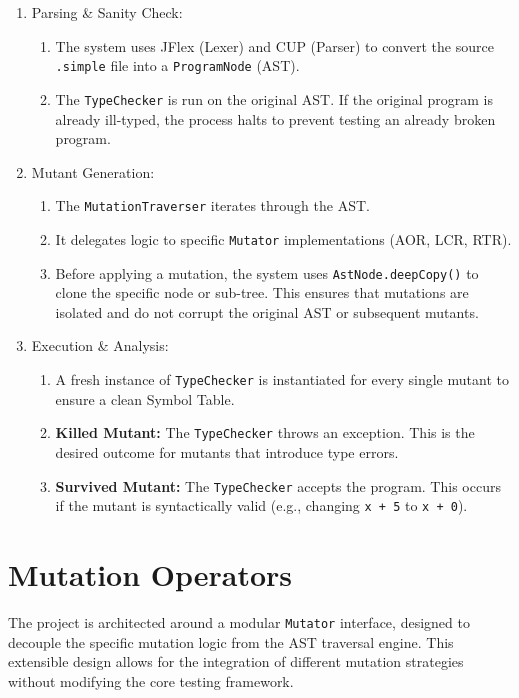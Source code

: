 \documentclass[titlepage]{article}
\begin{document}
\begin{enumerate}
    \item {
    Parsing \& Sanity Check:
        \begin{enumerate}
            \item The system uses JFlex (Lexer) and CUP (Parser) to convert the source \texttt{.simple} file into a \texttt{ProgramNode} (AST).
            \item The \texttt{TypeChecker} is run on the original AST. If the original program is already ill-typed, the process halts to prevent testing an already broken program.
        \end{enumerate} 
    }
    \item {
    Mutant Generation:
        \begin{enumerate}
            \item The \texttt{MutationTraverser} iterates through the AST.
            \item It delegates logic to specific \texttt{Mutator} implementations (AOR, LCR, RTR).
            \item Before applying a mutation, the system uses \texttt{AstNode.deepCopy()} to clone the specific node or sub-tree. This ensures that mutations are isolated and do not corrupt the original AST or subsequent mutants.
        \end{enumerate}
    }
    \item {
    Execution \& Analysis:
        \begin{enumerate}
            \item A fresh instance of \texttt{TypeChecker} is instantiated for every single mutant to ensure a clean Symbol Table.
            \item \textbf{Killed Mutant:} The \texttt{TypeChecker} throws an exception. This is the desired outcome for mutants that introduce type errors.
            \item \textbf{Survived Mutant:} The \texttt{TypeChecker} accepts the program. This occurs if the mutant is syntactically valid (e.g., changing \texttt{x + 5} to \texttt{x + 0}).
        \end{enumerate}
    }
\end{enumerate}

\section{Mutation Operators}

The project is architected around a modular \texttt{Mutator} interface, designed to decouple the specific mutation logic from the AST traversal engine. This extensible design allows for the integration of different mutation strategies without modifying the core testing framework.
\end{document}
